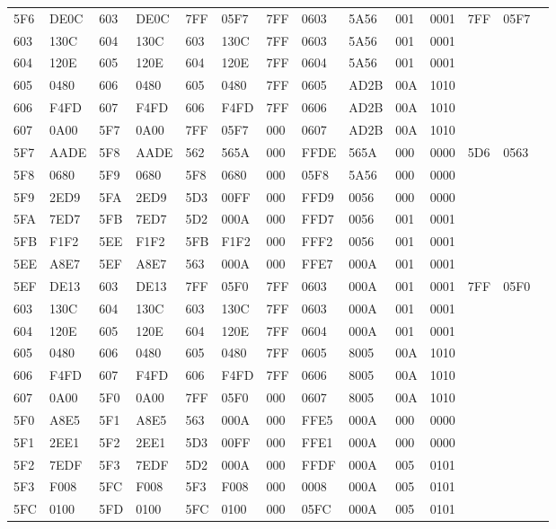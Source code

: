 \begin{tabular}{|*{14}{l|}}
5F6 & DE0C & 603 & DE0C & 7FF & 05F7 & 7FF & 0603 & 5A56 & 001 & 0001 & 7FF & 05F7\\
603 & 130C & 604 & 130C & 603 & 130C & 7FF & 0603 & 5A56 & 001 & 0001 & &\\
604 & 120E & 605 & 120E & 604 & 120E & 7FF & 0604 & 5A56 & 001 & 0001 & &\\
605 & 0480 & 606 & 0480 & 605 & 0480 & 7FF & 0605 & AD2B & 00A & 1010 & &\\
606 & F4FD & 607 & F4FD & 606 & F4FD & 7FF & 0606 & AD2B & 00A & 1010 & &\\
607 & 0A00 & 5F7 & 0A00 & 7FF & 05F7 & 000 & 0607 & AD2B & 00A & 1010 & &\\
5F7 & AADE & 5F8 & AADE & 562 & 565A & 000 & FFDE & 565A & 000 & 0000 & 5D6 & 0563\\
5F8 & 0680 & 5F9 & 0680 & 5F8 & 0680 & 000 & 05F8 & 5A56 & 000 & 0000 & &\\
5F9 & 2ED9 & 5FA & 2ED9 & 5D3 & 00FF & 000 & FFD9 & 0056 & 000 & 0000 & &\\
5FA & 7ED7 & 5FB & 7ED7 & 5D2 & 000A & 000 & FFD7 & 0056 & 001 & 0001 & &\\
5FB & F1F2 & 5EE & F1F2 & 5FB & F1F2 & 000 & FFF2 & 0056 & 001 & 0001 & &\\
5EE & A8E7 & 5EF & A8E7 & 563 & 000A & 000 & FFE7 & 000A & 001 & 0001 & &\\
5EF & DE13 & 603 & DE13 & 7FF & 05F0 & 7FF & 0603 & 000A & 001 & 0001 & 7FF & 05F0\\
603 & 130C & 604 & 130C & 603 & 130C & 7FF & 0603 & 000A & 001 & 0001 & &\\
604 & 120E & 605 & 120E & 604 & 120E & 7FF & 0604 & 000A & 001 & 0001 & &\\
605 & 0480 & 606 & 0480 & 605 & 0480 & 7FF & 0605 & 8005 & 00A & 1010 & &\\
606 & F4FD & 607 & F4FD & 606 & F4FD & 7FF & 0606 & 8005 & 00A & 1010 & &\\
607 & 0A00 & 5F0 & 0A00 & 7FF & 05F0 & 000 & 0607 & 8005 & 00A & 1010 & &\\
5F0 & A8E5 & 5F1 & A8E5 & 563 & 000A & 000 & FFE5 & 000A & 000 & 0000 & &\\
5F1 & 2EE1 & 5F2 & 2EE1 & 5D3 & 00FF & 000 & FFE1 & 000A & 000 & 0000 & &\\
5F2 & 7EDF & 5F3 & 7EDF & 5D2 & 000A & 000 & FFDF & 000A & 005 & 0101 & &\\
5F3 & F008 & 5FC & F008 & 5F3 & F008 & 000 & 0008 & 000A & 005 & 0101 & &\\
5FC & 0100 & 5FD & 0100 & 5FC & 0100 & 000 & 05FC & 000A & 005 & 0101 &     &      \\\hline
\end{tabular}